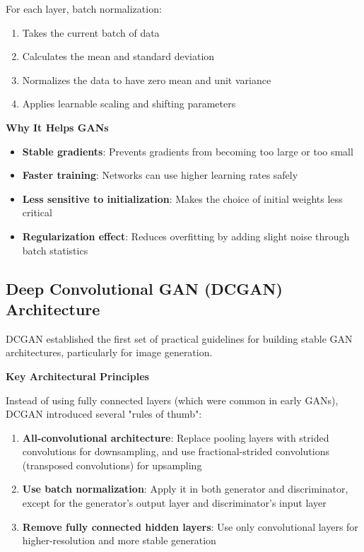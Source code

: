 For each layer, batch normalization:
\begin{enumerate}
    \item Takes the current batch of data
    \item Calculates the mean and standard deviation
    \item Normalizes the data to have zero mean and unit variance
    \item Applies learnable scaling and shifting parameters
\end{enumerate}

\textbf{Why It Helps GANs}
\begin{itemize}
    \item \textbf{Stable gradients}: Prevents gradients from becoming too large or too small
    \item \textbf{Faster training}: Networks can use higher learning rates safely
    \item \textbf{Less sensitive to initialization}: Makes the choice of initial weights less critical
    \item \textbf{Regularization effect}: Reduces overfitting by adding slight noise through batch statistics
\end{itemize}

\subsection{Deep Convolutional GAN (DCGAN) Architecture}

DCGAN \cite{radford2015unsupervised} established the first set of practical guidelines for building stable GAN architectures, particularly for image generation.

\textbf{Key Architectural Principles}

Instead of using fully connected layers (which were common in early GANs), DCGAN introduced several "rules of thumb":

\begin{enumerate}
    \item \textbf{All-convolutional architecture}: Replace pooling layers with strided convolutions for downsampling, and use fractional-strided convolutions (transposed convolutions) for upsampling
    
    \item \textbf{Use batch normalization}: Apply it in both generator and discriminator, except for the generator's output layer and discriminator's input layer
    
    \item \textbf{Remove fully connected hidden layers}: Use only convolutional layers for higher-resolution and more stable generation

\end{enumerate}

